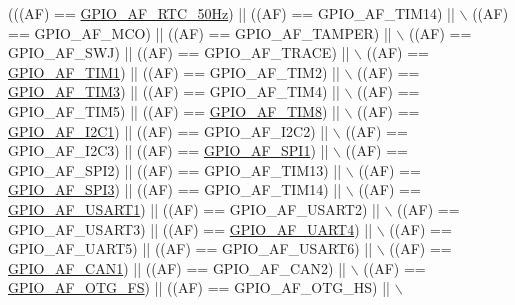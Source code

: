 \begin{DoxyCode}
(((AF) == \hyperlink{group___g_p_i_o___alternat__function__selection__define_ga93071f0121fab9f8f13e59c612ed6291}{GPIO\_AF\_RTC\_50Hz})  || ((AF) == GPIO\_AF\_TIM14)  || \(\backslash\)
                          ((AF) == GPIO\_AF\_MCO)       || ((AF) == GPIO\_AF\_TAMPER) || \(\backslash\)
                          ((AF) == GPIO\_AF\_SWJ)       || ((AF) == GPIO\_AF\_TRACE)  || \(\backslash\)
                          ((AF) == \hyperlink{group___g_p_i_o___alternat__function__selection__define_ga9a65573a3d8684febe1fda5c6cd8c992}{GPIO\_AF\_TIM1})      || ((AF) == GPIO\_AF\_TIM2)   || \(\backslash\)
                          ((AF) == \hyperlink{group___g_p_i_o___alternat__function__selection__define_ga8c6bda0c56abc29eef7709b52d9d3e0d}{GPIO\_AF\_TIM3})      || ((AF) == GPIO\_AF\_TIM4)   || \(\backslash\)
                          ((AF) == GPIO\_AF\_TIM5)      || ((AF) == \hyperlink{group___g_p_i_o___alternat__function__selection__define_gaf7562d5cf5d33dbc7b7c69df63182583}{GPIO\_AF\_TIM8})   || \(\backslash\)
                          ((AF) == \hyperlink{group___g_p_i_o___alternat__function__selection__define_gaa246f87c460c4bb4036b8ab39e0220f1}{GPIO\_AF\_I2C1})      || ((AF) == GPIO\_AF\_I2C2)   || \(\backslash\)
                          ((AF) == GPIO\_AF\_I2C3)      || ((AF) == \hyperlink{group___g_p_i_o___alternat__function__selection__define_ga7804aaf9275dbb5502312729a76d13be}{GPIO\_AF\_SPI1})   || \(\backslash\)
                          ((AF) == GPIO\_AF\_SPI2)      || ((AF) == GPIO\_AF\_TIM13)  || \(\backslash\)
                          ((AF) == \hyperlink{group___g_p_i_o___alternat__function__selection__define_gad6e716ad894aa5299273541c6966864a}{GPIO\_AF\_SPI3})      || ((AF) == GPIO\_AF\_TIM14)  || \(\backslash\)
                          ((AF) == \hyperlink{group___g_p_i_o___alternat__function__selection__define_ga790e1f37e75f475cf09c211f566fb069}{GPIO\_AF\_USART1})    || ((AF) == GPIO\_AF\_USART2) || \(\backslash\)
                          ((AF) == GPIO\_AF\_USART3)    || ((AF) == \hyperlink{group___g_p_i_o___alternat__function__selection__define_gad1754187e64b66681cc1447695062706}{GPIO\_AF\_UART4})  || \(\backslash\)
                          ((AF) == GPIO\_AF\_UART5)     || ((AF) == GPIO\_AF\_USART6) || \(\backslash\)
                          ((AF) == \hyperlink{group___g_p_i_o___alternat__function__selection__define_gaf5defeedc302bf348e31dd7bdcdd882f}{GPIO\_AF\_CAN1})      || ((AF) == GPIO\_AF\_CAN2)   || \(\backslash\)
                          ((AF) == \hyperlink{group___g_p_i_o___alternat__function__selection__define_gaeba0aeefec841e505170efc7762ae588}{GPIO\_AF\_OTG\_FS})    || ((AF) == GPIO\_AF\_OTG\_HS) || \(\backslash\)

\end{DoxyCode}

